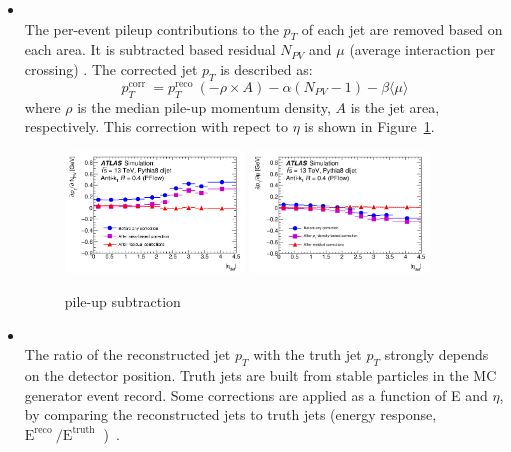 \begin{itemize}
    \item \textbf{} \\
    The per-event pileup contributions to the $p_T$ of each jet are removed based on each area. It is subtracted based residual $N_{PV}$ and $\mu$ (average interaction per crossing) \cite{JETM-2018-05}.
    The corrected jet $p_T$ is described as:
    \begin{equation}
     p_{T}^{\text {corr }}=p_{T}^{\text {reco }}(-\rho \times A)-\alpha\left(N_{P V}-1\right)-\beta\langle\mu\rangle
    \end{equation}
    where $\rho$ is the median pile-up momentum density, $A$ is the jet area, respectively.
    This correction with repect to $\eta$ is shown in Figure~\ref{fig:pileup}.
    \begin{figure}[tbp]
    \begin{center}
    \includegraphics[width=0.45\textwidth,keepaspectratio]{figures/Reconstruction/intimepileup}
    \includegraphics[width=0.45\textwidth,keepaspectratio]{figures/Reconstruction/outtimepileup}
    \caption{
    pile-up subtraction \cite{JETM-2018-05}
    }
    \label{fig:pileup}
    \end{center}
    \end{figure}
    \item \textbf{} \\
    The ratio of the reconstructed jet $p_T$ with the truth jet $p_T$ strongly depends on the detector position. 
    Truth jets are built from stable particles in the MC generator event record. 
    Some corrections are applied as a function of E and $\eta$, by comparing the reconstructed jets to truth jets (energy response, $\mathrm{E}^{\text {reco }} / \mathrm{E}^{\text {truth }}$ )~\cite{JETM-2018-05}.

\end{itemize}
